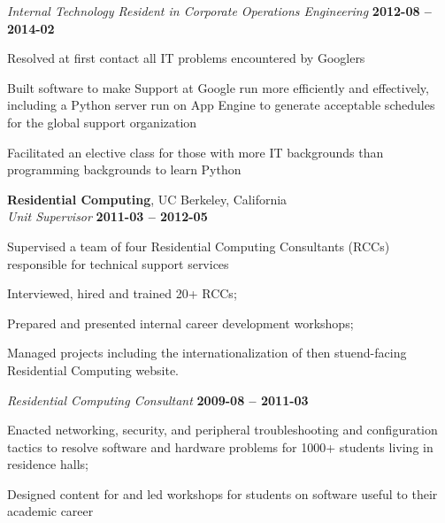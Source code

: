 \documentclass[margin,line]{resume}
\begin{document}
\begin{resume}
    \textsl{Internal Technology Resident in Corporate Operations Engineering} \hfill \textbf{2012-08 -- 2014-02}
    \begin{list2}
		\item Resolved at first contact all IT problems encountered by Googlers
    \item Built software to make Support at Google run more efficiently and effectively, including a Python server run on App Engine to generate acceptable schedules for the global support organization
    \item Facilitated an elective class for those with more IT backgrounds than programming backgrounds to learn Python
    \end{list2}\vspace{-1.5mm}

    \textbf{Residential Computing}, UC Berkeley, California \vspace{2mm}\\\vspace{0mm}%
    \textsl{Unit Supervisor} \hfill \textbf{2011-03 -- 2012-05}
    \begin{list2}
		\item Supervised a team of four Residential Computing Consultants (RCCs) responsible for technical support services
		\item Interviewed, hired and trained 20+ RCCs;
		\item Prepared and presented internal career development workshops;
		\item Managed projects including the internationalization of then stuend-facing Residential Computing website.
    \end{list2}\vspace{-1.5mm}


	\textsl{Residential Computing Consultant} \hfill \textbf{2009-08 -- 2011-03}
	\begin{list2}
		\item Enacted networking, security, and peripheral troubleshooting and configuration tactics to resolve software and hardware problems for 1000+ students living in residence halls;
		\item Designed content for and led workshops for students on software useful to their academic career
	\end{list2}\vspace{-1.5mm}


\end{resume}
\end{document}

